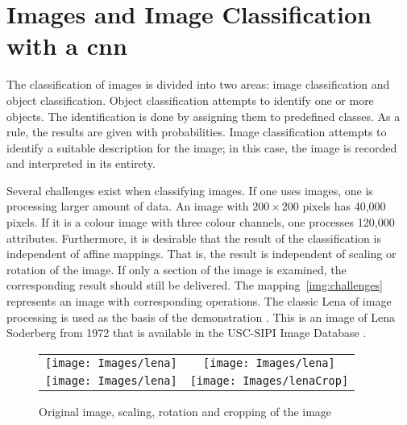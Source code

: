 %
%




\section{Images and Image Classification with a \ac{cnn}}


The classification of images is divided into two areas: image classification and object classification. 
Object classification attempts to identify one or more objects. The identification is done by assigning them to predefined classes. As a rule, the results are given with probabilities. Image classification attempts to identify a suitable description for the image; in this case, the image is recorded and interpreted in its entirety. \cite{Zhiqiang:2017}

Several challenges exist when classifying images. If one uses images, one is processing larger amount of data. An image with $200 \times 200$ pixels has 40,000 pixels. If it is a colour image with three colour channels, one processes 120,000 attributes. 
Furthermore, it is desirable that the result of the classification is independent of affine mappings. That is, the result is independent of scaling or rotation of the image. If only a section of the image is examined, the corresponding result should still be delivered. The mapping~\ref{img:challenges} represents an image with corresponding operations.  
The classic \glqq Lena\grqq{} of image processing is used as the basis of the demonstration \cite{Munson:1996}. This is an image of Lena Soderberg from 1972 that is available in the USC-SIPI Image Database \cite{Weber:1997}.



\begin{figure}[!h]
	\centering
	\begin{tabular}{cc}
		\texttt{[image: Images/lena]}    &
		\texttt{[image: Images/lena]}    \\
		\texttt{[image: Images/lena]}    &
		\texttt{[image: Images/lenaCrop]}    \\
	\end{tabular}
	\caption{Original image, scaling, rotation and cropping of the image}\label{img:Herausforderungen}
\end{figure}



